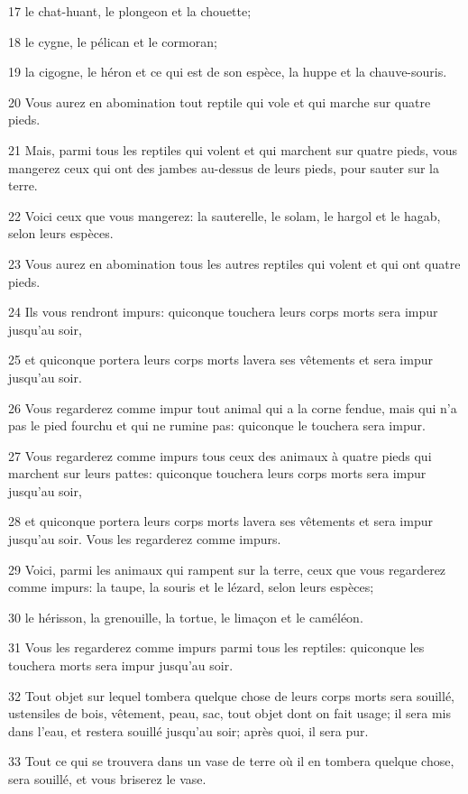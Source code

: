 \par 17 le chat-huant, le plongeon et la chouette;
\par 18 le cygne, le pélican et le cormoran;
\par 19 la cigogne, le héron et ce qui est de son espèce, la huppe et la chauve-souris.
\par 20 Vous aurez en abomination tout reptile qui vole et qui marche sur quatre pieds.
\par 21 Mais, parmi tous les reptiles qui volent et qui marchent sur quatre pieds, vous mangerez ceux qui ont des jambes au-dessus de leurs pieds, pour sauter sur la terre.
\par 22 Voici ceux que vous mangerez: la sauterelle, le solam, le hargol et le hagab, selon leurs espèces.
\par 23 Vous aurez en abomination tous les autres reptiles qui volent et qui ont quatre pieds.
\par 24 Ils vous rendront impurs: quiconque touchera leurs corps morts sera impur jusqu'au soir,
\par 25 et quiconque portera leurs corps morts lavera ses vêtements et sera impur jusqu'au soir.
\par 26 Vous regarderez comme impur tout animal qui a la corne fendue, mais qui n'a pas le pied fourchu et qui ne rumine pas: quiconque le touchera sera impur.
\par 27 Vous regarderez comme impurs tous ceux des animaux à quatre pieds qui marchent sur leurs pattes: quiconque touchera leurs corps morts sera impur jusqu'au soir,
\par 28 et quiconque portera leurs corps morts lavera ses vêtements et sera impur jusqu'au soir. Vous les regarderez comme impurs.
\par 29 Voici, parmi les animaux qui rampent sur la terre, ceux que vous regarderez comme impurs: la taupe, la souris et le lézard, selon leurs espèces;
\par 30 le hérisson, la grenouille, la tortue, le limaçon et le caméléon.
\par 31 Vous les regarderez comme impurs parmi tous les reptiles: quiconque les touchera morts sera impur jusqu'au soir.
\par 32 Tout objet sur lequel tombera quelque chose de leurs corps morts sera souillé, ustensiles de bois, vêtement, peau, sac, tout objet dont on fait usage; il sera mis dans l'eau, et restera souillé jusqu'au soir; après quoi, il sera pur.
\par 33 Tout ce qui se trouvera dans un vase de terre où il en tombera quelque chose, sera souillé, et vous briserez le vase.
